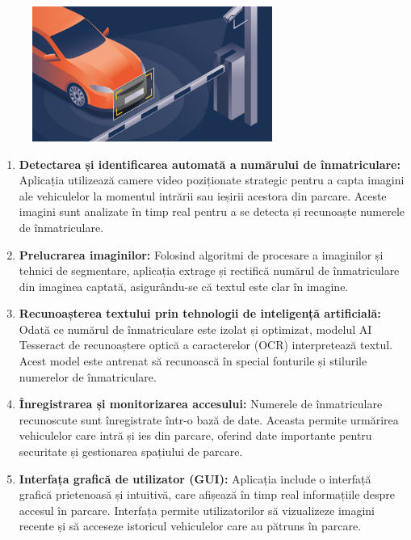 \documentclass[a4paper,12pt]{report}
\begin{document}
\begin{figure}[h]
    \centering
    \includegraphics[width=0.7\textwidth]{images/picture.jpg}
\end{figure}
\FloatBarrier

\begin{enumerate}[label=\Roman*.]
    \item \textbf{Detectarea și identificarea automată a numărului de înmatriculare:} Aplicația utilizează camere video poziționate strategic pentru a capta imagini ale vehiculelor la momentul intrării sau ieșirii acestora din parcare. Aceste imagini sunt analizate în timp real pentru a se detecta și recunoaște numerele de înmatriculare.

    \item \textbf{Prelucrarea imaginilor:} Folosind algoritmi de procesare a imaginilor și tehnici de segmentare, aplicația extrage și rectifică numărul de înmatriculare din imaginea captată, asigurându-se că textul este clar în imagine.

    \item \textbf{Recunoașterea textului prin tehnologii de inteligență artificială:} Odată ce numărul de înmatriculare este izolat și optimizat, modelul AI Tesseract de recunoaștere optică a caracterelor (OCR) interpretează textul. Acest model este antrenat să recunoască în special fonturile și stilurile numerelor de înmatriculare.

    \item \textbf{Înregistrarea și monitorizarea accesului:} Numerele de înmatriculare recunoscute sunt înregistrate într-o bază de date. Aceasta permite urmărirea vehiculelor care intră și ies din parcare, oferind date importante pentru securitate și gestionarea spațiului de parcare.

    \item \textbf{Interfața grafică de utilizator (GUI):} Aplicația include o interfață grafică prietenoasă și intuitivă, care afișează în timp real informațiile despre accesul în parcare. Interfața permite utilizatorilor să vizualizeze imagini recente și să acceseze istoricul vehiculelor care au pătruns în parcare.
\end{enumerate}
\end{document}
